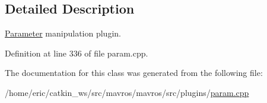 \subsection{Detailed Description}
\mbox{\hyperlink{classmavros_1_1std__plugins_1_1Parameter}{Parameter}} manipulation plugin. 

Definition at line 336 of file param.\+cpp.



The documentation for this class was generated from the following file\+:\begin{DoxyCompactItemize}
\item 
/home/eric/catkin\+\_\+ws/src/mavros/mavros/src/plugins/\mbox{\hyperlink{param_8cpp}{param.\+cpp}}\end{DoxyCompactItemize}
